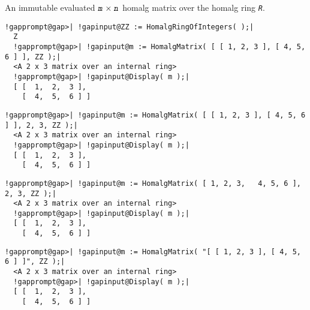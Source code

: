 \documentclass[a4paper,11pt]{report}
\begin{document}
{{{ An immutable evaluated $\mbox{\texttt{\mdseries\slshape m}} \times \mbox{\texttt{\mdseries\slshape n}}$ \textsf{homalg} matrix over the \textsf{homalg} ring \mbox{\texttt{\mdseries\slshape R}}. 
\begin{Verbatim}[commandchars=!@|,fontsize=\small,frame=single,label=Example]
  !gapprompt@gap>| !gapinput@ZZ := HomalgRingOfIntegers( );|
  Z
  !gapprompt@gap>| !gapinput@m := HomalgMatrix( [ [ 1, 2, 3 ], [ 4, 5, 6 ] ], ZZ );|
  <A 2 x 3 matrix over an internal ring>
  !gapprompt@gap>| !gapinput@Display( m );|
  [ [  1,  2,  3 ],
    [  4,  5,  6 ] ]
\end{Verbatim}
 
\begin{Verbatim}[commandchars=!@|,fontsize=\small,frame=single,label=Example]
  !gapprompt@gap>| !gapinput@m := HomalgMatrix( [ [ 1, 2, 3 ], [ 4, 5, 6 ] ], 2, 3, ZZ );|
  <A 2 x 3 matrix over an internal ring>
  !gapprompt@gap>| !gapinput@Display( m );|
  [ [  1,  2,  3 ],
    [  4,  5,  6 ] ]
\end{Verbatim}
 
\begin{Verbatim}[commandchars=!@|,fontsize=\small,frame=single,label=Example]
  !gapprompt@gap>| !gapinput@m := HomalgMatrix( [ 1, 2, 3,   4, 5, 6 ], 2, 3, ZZ );|
  <A 2 x 3 matrix over an internal ring>
  !gapprompt@gap>| !gapinput@Display( m );|
  [ [  1,  2,  3 ],
    [  4,  5,  6 ] ]
\end{Verbatim}
 
\begin{Verbatim}[commandchars=!@|,fontsize=\small,frame=single,label=Example]
  !gapprompt@gap>| !gapinput@m := HomalgMatrix( "[ [ 1, 2, 3 ], [ 4, 5, 6 ] ]", ZZ );|
  <A 2 x 3 matrix over an internal ring>
  !gapprompt@gap>| !gapinput@Display( m );|
  [ [  1,  2,  3 ],
    [  4,  5,  6 ] ]
\end{Verbatim}
 
}}}
\end{document}
